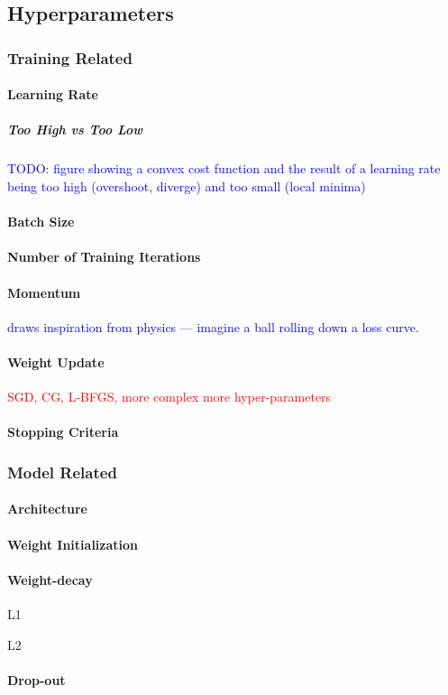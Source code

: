 \subsection{Hyperparameters}

\subsubsection{Training Related}

\paragraph{Learning Rate}

\subparagraph{Too High vs Too Low}

\textcolor{blue}{TODO: figure showing a convex cost function and the result of a learning rate being too high (overshoot, diverge) and too small (local minima)}

\paragraph{Batch Size}

\paragraph{Number of Training Iterations}

\paragraph{Momentum}

\textcolor{blue}{draws inspiration from physics --- imagine a ball rolling down a loss curve.}

\paragraph{Weight Update}

\textcolor{red}{SGD, CG, L-BFGS, more complex more hyper-parameters}

\paragraph{Stopping Criteria}

\subsubsection{Model Related}

\paragraph{Architecture}

\paragraph{Weight Initialization}

\paragraph{Weight-decay}

L1

L2

\paragraph{Drop-out}

